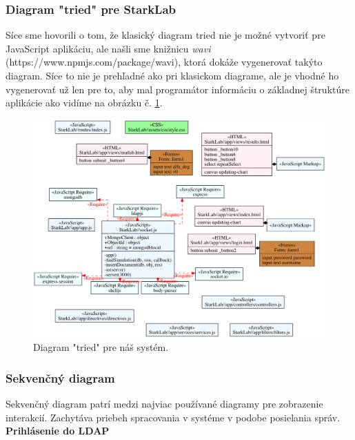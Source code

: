 \subsubsection{Diagram "tried" pre StarkLab}
Síce sme hovorili o tom, že klasický diagram tried nie je možné vytvoriť pre JavaScript aplikáciu, ale našli sme knižnicu \textit{wavi} (https://www.npmjs.com/package/wavi), ktorá dokáže vygenerovať takýto diagram. Síce to nie je prehľadné ako pri klasickom diagrame, ale je vhodné ho vygenerovať už len pre to, aby mal programátor informáciu o základnej štruktúre aplikácie ako vidíme na obrázku č. \ref{img-class-diagram}.

\begin{figure}[H]
  \centering
  \includegraphics[scale=0.40]{img/diagrams/class.png}
  \caption{Diagram "tried" pre náš systém.}
  \label{img-class-diagram}
\end{figure}

\subsubsection{Sekvenčný diagram}\label{diagram-sequence-section}
Sekvenčný diagram patrí medzi najviac používané diagramy pre zobrazenie interakcií. Zachytáva priebeh spracovania v systéme v podobe posielania správ.\\


\noindent \textbf{Prihlásenie do LDAP}

